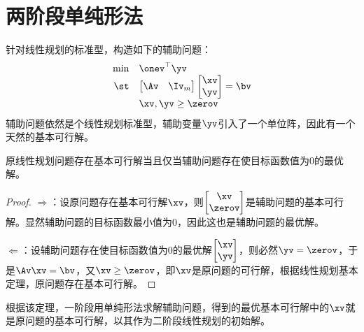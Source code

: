 \documentclass{ctexart}
\begin{document}
\section{两阶段单纯形法}

针对线性规划的标准型，构造如下的辅助问题：
\begin{align*}
    \begin{array}{rl}
        \min & \onev^\top \yv      \\
        \st  & \begin{bmatrix}
                   \Av & \Iv_m
               \end{bmatrix}
        \begin{bmatrix}
            \xv \\ \yv
        \end{bmatrix} = \bv        \\
             & \xv, \yv \ge \zerov
    \end{array}
\end{align*}
辅助问题依然是个线性规划标准型，辅助变量$\yv$引入了一个单位阵，因此有一个天然的基本可行解。

\begin{theorem}
    原线性规划问题存在基本可行解当且仅当辅助问题存在使目标函数值为$0$的最优解。
\end{theorem}

\begin{proof}
    $\Rightarrow$：设原问题存在基本可行解$\xv$，则$\begin{bmatrix}
            \xv \\ \zerov
        \end{bmatrix}$是辅助问题的基本可行解。显然辅助问题的目标函数最小值为$0$，因此这也是辅助问题的最优解。

    $\Leftarrow$：设辅助问题存在使目标函数值为$0$的最优解$\begin{bmatrix}
            \xv \\ \yv
        \end{bmatrix}$，则必然$\yv = \zerov$，于是$\Av \xv = \bv$，又$\xv \ge \zerov$，即$\xv$是原问题的可行解，根据线性规划基本定理，原问题存在基本可行解。
\end{proof}

根据该定理，一阶段用单纯形法求解辅助问题，得到的最优基本可行解中的$\xv$就是原问题的基本可行解，以其作为二阶段线性规划的初始解。
\end{document}
